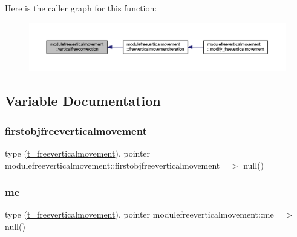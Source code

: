 Here is the caller graph for this function\+:\nopagebreak
\begin{figure}[H]
\begin{center}
\leavevmode
\includegraphics[width=350pt]{namespacemodulefreeverticalmovement_a31ae6c338b4621e00f2dd8c66bb9268f_icgraph}
\end{center}
\end{figure}


\subsection{Variable Documentation}
\mbox{\label{namespacemodulefreeverticalmovement_af05afdb031d50e81aaa92c9b99793254}} 
\subsubsection{\texorpdfstring{firstobjfreeverticalmovement}{firstobjfreeverticalmovement}}
{\footnotesize\ttfamily type (\mbox{\hyperlink{structmodulefreeverticalmovement_1_1t__freeverticalmovement}{t\+\_\+freeverticalmovement}}), pointer modulefreeverticalmovement\+::firstobjfreeverticalmovement =$>$ null()\hspace{0.3cm}{\ttfamily [private]}}

\mbox{\label{namespacemodulefreeverticalmovement_a28b010cc15d0e2ac1ad1a9ddf71afb4d}} 
\subsubsection{\texorpdfstring{me}{me}}
{\footnotesize\ttfamily type (\mbox{\hyperlink{structmodulefreeverticalmovement_1_1t__freeverticalmovement}{t\+\_\+freeverticalmovement}}), pointer modulefreeverticalmovement\+::me =$>$ null()\hspace{0.3cm}{\ttfamily [private]}}

